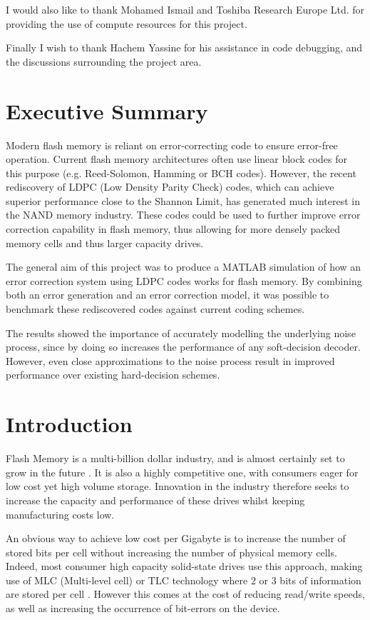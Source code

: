 \documentclass[11pt]{article}
\numberwithin{equation}{subsection}
\begin{document}
I would also like to thank Mohamed Ismail and Toshiba Research Europe Ltd. for providing the use of compute resources for this project.

Finally I wish to thank Hachem Yassine for his assistance in code debugging, and the discussions surrounding the project area.

\section{Executive Summary}

Modern flash memory is reliant on error-correcting code to ensure error-free operation. Current flash memory architectures often use linear block codes for this purpose (e.g. Reed-Solomon, Hamming or BCH codes). However, the recent rediscovery of LDPC (Low Density Parity Check) codes, which can achieve superior performance close to the Shannon Limit, has generated much interest in the NAND memory industry. These codes could be used to further improve error correction capability in flash memory, thus allowing for more densely packed memory cells and thus larger capacity drives.

The general aim of this project was to produce a MATLAB simulation of how an error correction system using LDPC codes works for flash memory.  By combining both an error generation and an error correction model, it was possible to benchmark these rediscovered codes against current coding schemes.

The results showed the importance of accurately modelling the underlying noise process, since by doing so increases the performance of any soft-decision decoder. However, even close approximations to the noise process result in improved performance over existing hard-decision schemes.

\singlespacing
\tableofcontents
\doublespacing
\section{Introduction}
Flash Memory is a multi-billion dollar industry, and is almost certainly set to grow in the future \cite{dong2012estimating}. It is also a highly competitive one, with consumers eager for low cost yet high volume storage. Innovation in the industry therefore seeks to increase the capacity and performance of these drives whilst keeping manufacturing costs low. 

An obvious way to achieve low cost per Gigabyte is to increase the number of stored bits per cell without increasing the number of physical memory cells. Indeed, most consumer high capacity solid-state drives use this approach, making use of MLC (Multi-level cell) or TLC technology where 2 or 3 bits of information are stored per cell \cite{dong2012estimating}. However this comes at the cost of reducing read/write speeds, as well as increasing the occurrence of bit-errors on the device. 
\end{document}
